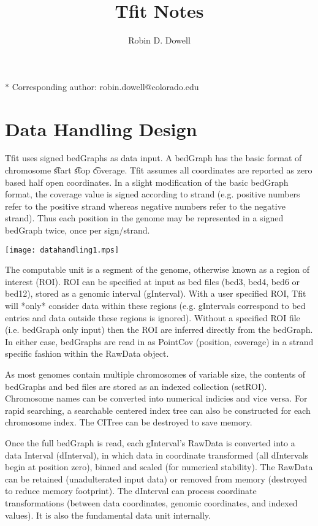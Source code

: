 \documentclass[11pt]{article}
\title{Tfit Notes}
\author{Robin D. Dowell}
\date{}
\date{ }
\begin{document}
\maketitle
\noindent $*$ Corresponding author: robin.dowell@colorado.edu

\section{Data Handling Design}
Tfit uses signed bedGraphs as data input.  A bedGraph has the basic format of 
chromosome \t start \t stop \t coverage.  Tfit assumes all coordinates are
reported as zero based half open coordinates.  In a slight modification of
the basic bedGraph format, the coverage value is signed according to 
strand (e.g. positive numbers refer to the positive strand whereas negative 
numbers refer to the negative strand).  Thus each position in the genome 
may be represented in a signed bedGraph twice, once per sign/strand.

\texttt{[image: datahandling1.mps]}

The computable unit is a segment of the genome, otherwise known as a region
of interest (ROI).  ROI can be specified at input as bed files (bed3, bed4,
bed6 or bed12), stored as a genomic interval (gInterval). With a 
user specified ROI, Tfit will *only* consider data within these regions
(e.g. gIntervals correspond to bed entries and data outside these regions 
 is ignored).  Without a specified ROI file (i.e. bedGraph only input) 
then the ROI are inferred directly from the bedGraph.   In either case,
bedGraphs are read in as PointCov (position, coverage) in a strand specific
fashion within the RawData object.   

As most genomes contain multiple chromosomes of variable size, the contents
of bedGraphs and bed files are stored as an indexed collection (setROI).
Chromosome names can be converted into numerical indicies and vice versa.
For rapid searching, a searchable centered index tree can also be constructed
for each chromosome index.  The CITree can be destroyed to save memory. 

Once the full bedGraph is read, each gInterval's RawData is converted into
a data Interval (dInterval), in which data in coordinate transformed (all
dIntervals begin at position zero), binned and scaled (for numerical
stability).  The RawData can be retained (unadulterated input data) or removed 
from memory (destroyed to reduce memory footprint).  The dInterval can 
process coordinate transformations (between data coordinates, genomic 
coordinates, and indexed values).  It is also the fundamental data unit 
internally.
\end{document}
